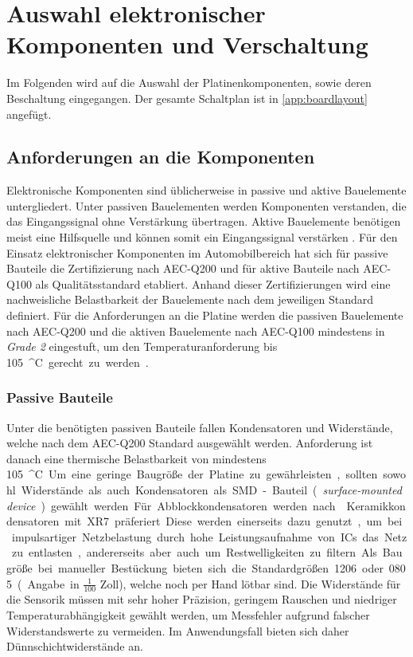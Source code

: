 \chapter{Auswahl elektronischer Komponenten und Verschaltung}\label{ch:komp}
Im Folgenden wird auf die Auswahl der Platinenkomponenten, sowie deren Beschaltung eingegangen. Der gesamte Schaltplan ist in \autoref{app:boardlayout} angefügt.
\section{Anforderungen an die Komponenten}
Elektronische Komponenten sind üblicherweise in passive und aktive Bauelemente untergliedert. Unter passiven Bauelementen werden Komponenten verstanden, die das Eingangssignal ohne Verstärkung übertragen. Aktive Bauelemente benötigen meist eine Hilfsquelle und können somit ein Eingangssignal verstärken \cite[S.25]{haendschke}. Für den Einsatz elektronischer Komponenten im Automobilbereich hat sich für passive Bauteile die Zertifizierung nach AEC-Q200 und für aktive Bauteile nach AEC-Q100 als Qualitätsstandard etabliert. Anhand dieser Zertifizierungen wird eine nachweisliche Belastbarkeit der Bauelemente nach dem jeweiligen Standard definiert. Für die Anforderungen an die Platine werden die passiven Bauelemente nach AEC-Q200 und die aktiven Bauelemente nach AEC-Q100 mindestens in \textit{Grade 2} eingestuft, um den Temperaturanforderung bis \SI{105}{^\circ C} gerecht zu werden \cite[S.6]{aecq}. 
\subsection{Passive Bauteile}
Unter die benötigten passiven Bauteile fallen Kondensatoren und Widerstände, welche nach dem AEC-Q200 Standard ausgewählt werden. Anforderung ist danach eine thermische Belastbarkeit von mindestens \SI{105}{^\circ C}. Um eine geringe Baugröße der Platine zu gewährleisten, sollten sowohl Widerstände als auch Kondensatoren als SMD-Bauteil (\textit{surface-mounted device}) gewählt werden. Für Abblockkondensatoren werden nach \cite[S.7]{ldo} Keramikkondensatoren mit XR7 präferiert. Diese werden einerseits dazu genutzt, um bei impulsartiger Netzbelastung durch hohe Leistungsaufnahme von ICs das Netz zu entlasten, andererseits aber auch um Restwelligkeiten zu filtern. Als Baugröße bei manueller Bestückung bieten sich die Standardgrößen 1206 oder 0805 (Angabe in $\frac{1}{100}$ Zoll), welche noch per Hand lötbar sind. Die Widerstände für die Sensorik müssen mit sehr hoher Präzision, geringem Rauschen und niedriger Temperaturabhängigkeit gewählt werden, um Messfehler aufgrund falscher Widerstandswerte zu vermeiden. Im Anwendungsfall bieten sich daher Dünnschichtwiderstände an.
